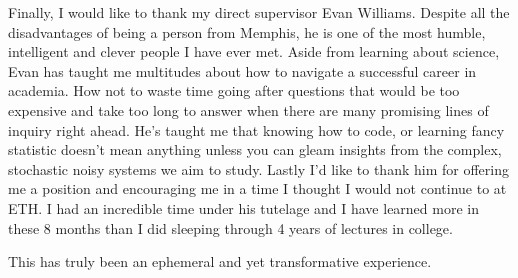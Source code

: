 \documentclass[a4paper]{book}
\begin{document}
Finally, I would like to thank my direct supervisor Evan Williams. Despite all the disadvantages of being a person from Memphis, he is one of the most humble, intelligent and clever people I have ever met. Aside from learning about science, Evan has taught me multitudes about how to navigate a successful career in academia. How not to waste time going after questions that would be too expensive and take too long to answer when there are many promising lines of inquiry right ahead. He's taught me that knowing how to code, or learning fancy statistic doesn't mean anything unless you can gleam insights from the complex, stochastic noisy systems we aim to study. Lastly I'd like to thank him for offering me a position and encouraging me in a time I thought I would not continue to at ETH. I had an incredible time under his tutelage and I have learned more in these 8 months than I did sleeping through 4 years of lectures in college.

This has truly been an ephemeral and yet transformative experience. 
	
\end{document}
